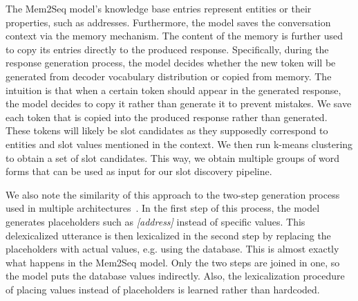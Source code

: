 The Mem2Seq model's knowledge base entries represent entities or their properties, such as addresses.
Furthermore, the model saves the conversation context via the memory mechanism.
The content of the memory is further used to copy its entries directly to the produced response.
Specifically, during the response generation process, the model decides whether the new token will be generated from decoder vocabulary distribution or copied from memory.
The intuition is that when a certain token should appear in the generated response, the model decides to copy it rather than generate it to prevent mistakes.
We save each token that is copied into the produced response rather than generated.
These tokens will likely be slot candidates as they supposedly correspond to entities and slot values mentioned in the context.
We then run k-means clustering to obtain a set of slot candidates.
This way, we obtain multiple groups of word forms that can be used as input for our slot discovery pipeline.

We also note the similarity of this approach to the two-step generation process used in multiple architectures~\citep{lei2018sequicity, peng2021soloist}.
In the first step of this process, the model generates placeholders such as \emph{[address]} instead of specific values.
This delexicalized utterance is then lexicalized in the second step by replacing the placeholders with actual values, e.g. using the database.
This is almost exactly what happens in the Mem2Seq model.
Only the two steps are joined in one, so the model puts the database values indirectly.
Also, the lexicalization procedure of placing values instead of placeholders is learned rather than hardcoded.

